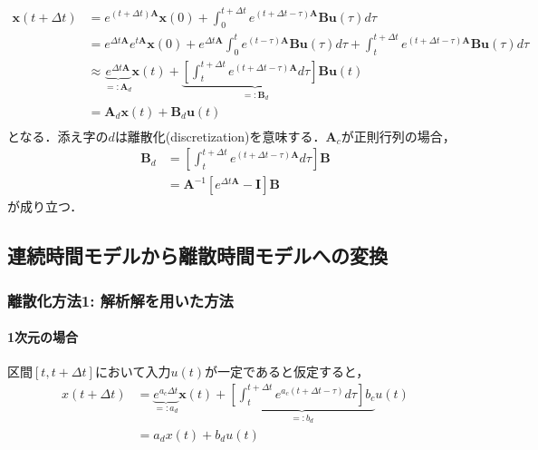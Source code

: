 \begin{align}
\mathbf{x}(t+\Delta t)&=e^{(t+\Delta t)\mathbf{A}}\mathbf{x}(0)+\int_0^{t+\Delta t} e^{(t+\Delta t-\tau)\mathbf{A}}\mathbf{B}\mathbf{u}(\tau) d\tau\\
&=e^{\Delta t\mathbf{A}}e^{t\mathbf{A}}\mathbf{x}(0)+e^{\Delta t\mathbf{A}}\int_0^{t} e^{(t-\tau)\mathbf{A}}\mathbf{B}\mathbf{u}(\tau) d\tau + \int_t^{t+\Delta t} e^{(t+\Delta t-\tau)\mathbf{A}}\mathbf{B}\mathbf{u}(\tau) d\tau\\
&\approx \underbrace{e^{\Delta t\mathbf{A}}}_{=: \mathbf{A}_d}\mathbf{x}(t)+\underbrace{\left[\int_t^{t+\Delta t} e^{(t+\Delta t-\tau)\mathbf{A}} d\tau\right] \mathbf{B}}_{=: \mathbf{B}_d}\mathbf{u}(t)\\
&=\mathbf{A}_d\mathbf{x}(t)+\mathbf{B}_d\mathbf{u}(t)\\
\end{align}
となる．添え字の$d$は離散化(discretization)を意味する．$\mathbf{A}_c$が正則行列の場合，
\begin{align}
\mathbf{B}_d &= \left[\int_t^{t+\Delta t} e^{(t+\Delta t-\tau)\mathbf{A}} d\tau\right] \mathbf{B}\\
&=\mathbf{A}^{-1}\left[e^{\Delta t \mathbf{A}}-\mathbf{I}\right]\mathbf{B}
\end{align}
が成り立つ．
\subsection{連続時間モデルから離散時間モデルへの変換}
\subsubsection{離散化方法1: 解析解を用いた方法}
\paragraph{1次元の場合}
区間$[t, t+\Delta t]$において入力$u(t)$が一定であると仮定すると，
\begin{align}
x(t+\Delta t)&= \underbrace{e^{a_c \Delta t}}_{=: a_d}\mathbf{x}(t)+\underbrace{\left[\int_t^{t+\Delta t} e^{a_c(t+\Delta t-\tau)} d\tau\right] b_c}_{=: b_d}u(t)\\
&=a_d x(t)+b_d u(t)\\
\end{align}
